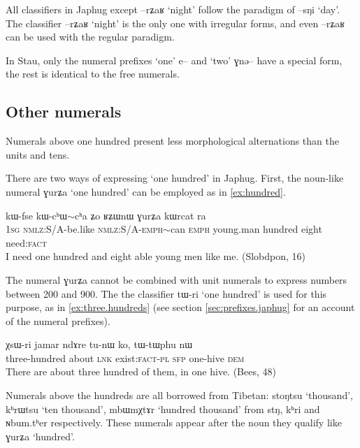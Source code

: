 \documentclass[oldfontcommands,oneside,a4paper,12pt]{article}
\newcommand{\ipa}[1]{{\phon#1}}
\newcommand{\redp}{$\mathtt{\sim}$}
\begin{document}
All classifiers in Japhug except \ipa{--rʑaʁ} `night' follow the paradigm of \ipa{--sŋi} `day'. The classifier \ipa{--rʑaʁ} `night' is the only one with irregular forms, and even  \ipa{--rʑaʁ} can be used with the regular paradigm.
 

 
 In Stau, only the numeral prefixes  `one' \ipa{e--} and `two' \ipa{ɣnə--} have a special form, the rest is identical to the free numerals.
 
 \subsection{Other numerals}
Numerals above one hundred present less morphological alternations than the units and tens.
 
 There are two ways of expressing `one hundred' in Japhug. First, the noun-like numeral \ipa{ɣurʑa}   `one hundred' can be employed as in \ref{ex:hundred}.

\begin{exe}
\ex \label{ex:hundred}
\gll \ipa{aʑo} 	\ipa{kɯ-fse} 	\ipa{kɯ-cʰɯ\redp{}cʰa} 	\ipa{ʑo} 	\ipa{ʁʑɯnɯ} 	\ipa{ɣurʑa} 	\ipa{kɯrcat} 	\ipa{ra} \\
\textsc{1sg} \textsc{nmlz}:S/A-be.like  \textsc{nmlz}:S/A-\textsc{emph}\redp{}can \textsc{emph} young.man hundred eight need:\textsc{fact} \\
\glt I need one hundred and eight able young men like me. (Slobdpon, 16)
\end{exe}

The numeral \ipa{ɣurʑa}  cannot be combined with unit numerals to express numbers between 200 and 900. The  the classifier \ipa{tɯ-ri} `one hundred' is used for this purpose, as in \ref{ex:three.hundreds} (see section \ref{sec:prefixes.japhug} for an account of the numeral prefixes).
\begin{exe}
\ex \label{ex:three.hundreds}
\gll
\ipa{χsɯ-ri} 	\ipa{jamar} 	\ipa{ndɤre} 	\ipa{tu-nɯ} 	\ipa{ko,} 	\ipa{tɯ-tɯphu} 	\ipa{nɯ} \\
three-hundred about \textsc{lnk} exist:\textsc{fact-pl} \textsc{sfp} one-hive \textsc{dem} \\
\glt There are about three hundred of them, in one hive. (Bees, 48)
\end{exe}
 
  

Numerals above the hundreds are all borrowed from Tibetan: \ipa{stoŋtsu} `thousand', \ipa{kʰrɯtsu} `ten thousand', \ipa{mbɯmχtɤr} `hundred thousand' from \ipa{stŋ}, \ipa{kʰri} and \ipa{ɴbum.tʰer} respectively. These numerals appear after the noun they qualify like \ipa{ɣurʑa} `hundred'.  
 
\end{document}
